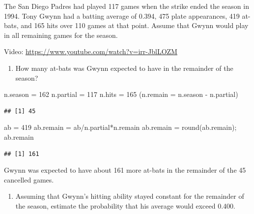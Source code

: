 \documentclass[
  11pt,
]{book}
\newenvironment{Shaded}{\begin{snugshade}}{\end{snugshade}}
\newcommand{\AttributeTok}[1]{\textcolor[rgb]{0.77,0.63,0.00}{#1}}
\newcommand{\DecValTok}[1]{\textcolor[rgb]{0.00,0.00,0.81}{#1}}
\newcommand{\FunctionTok}[1]{\textcolor[rgb]{0.00,0.00,0.00}{#1}}
\newcommand{\NormalTok}[1]{#1}
\newcommand{\OtherTok}[1]{\textcolor[rgb]{0.56,0.35,0.01}{#1}}
\newcommand{\SpecialCharTok}[1]{\textcolor[rgb]{0.00,0.00,0.00}{#1}}
\providecommand{\tightlist}{%
  \setlength{\itemsep}{0pt}\setlength{\parskip}{0pt}}
\theoremstyle{definition}
\theoremstyle{definition}
\theoremstyle{definition}
\theoremstyle{definition}
\theoremstyle{remark}
\begin{document}
The San Diego Padres had played 117 games when the strike ended the season in 1994. Tony Gwynn had a batting average of 0.394, 475 plate appearances, 419 at-bats, and 165 hits over 110 games at that point. Assume that Gwynn would play in all remaining games for the season.

Video: \url{https://www.youtube.com/watch?v=irr-JblLOZM}

\begin{enumerate}
\def\labelenumi{(\alph{enumi})}
\tightlist
\item
  How many at-bats was Gwynn expected to have in the remainder of the season?
\end{enumerate}

\begin{Shaded}
\begin{Highlighting}[]
\NormalTok{n.season }\OtherTok{=} \DecValTok{162}
\NormalTok{n.partial }\OtherTok{=} \DecValTok{117}
\NormalTok{n.hits }\OtherTok{=} \DecValTok{165}
\NormalTok{(}\AttributeTok{n.remain =}\NormalTok{ n.season }\SpecialCharTok{{-}}\NormalTok{ n.partial)}
\end{Highlighting}
\end{Shaded}

\begin{verbatim}
## [1] 45
\end{verbatim}

\begin{Shaded}
\begin{Highlighting}[]
\NormalTok{ab }\OtherTok{=} \DecValTok{419}
\NormalTok{ab.remain }\OtherTok{=}\NormalTok{ ab}\SpecialCharTok{/}\NormalTok{n.partial}\SpecialCharTok{*}\NormalTok{n.remain}
\NormalTok{ab.remain }\OtherTok{=} \FunctionTok{round}\NormalTok{(ab.remain); ab.remain}
\end{Highlighting}
\end{Shaded}

\begin{verbatim}
## [1] 161
\end{verbatim}

Gwynn was expected to have about 161 more at-bats in the remainder of the 45 cancelled games.

\begin{enumerate}
\def\labelenumi{(\alph{enumi})}
\setcounter{enumi}{1}
\tightlist
\item
  Assuming that Gwynn's hitting ability stayed constant for the remainder of the season, estimate the probability that his average would exceed 0.400.
\end{enumerate}
\end{document}
